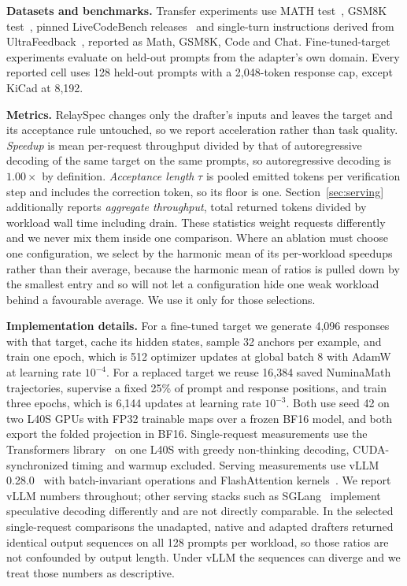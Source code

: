 \textbf{Datasets and benchmarks.} Transfer experiments use MATH test~\citep{hendrycks2021math}, GSM8K test~\citep{cobbe2021gsm8k}, pinned LiveCodeBench releases~\citep{jain2024livecodebench} and single-turn instructions derived from UltraFeedback~\citep{cui2024ultrafeedback}, reported as Math, GSM8K, Code and Chat. Fine-tuned-target experiments evaluate on held-out prompts from the adapter's own domain. Every reported cell uses 128 held-out prompts with a 2{,}048-token response cap, except KiCad at 8{,}192.

\textbf{Metrics.} RelaySpec changes only the drafter's inputs and leaves the target and its acceptance rule untouched, so we report acceleration rather than task quality. \emph{Speedup} is mean per-request throughput divided by that of autoregressive decoding of the same target on the same prompts, so autoregressive decoding is $1.00\times$ by definition. \emph{Acceptance length} $\tau$ is pooled emitted tokens per verification step and includes the correction token, so its floor is one. Section~\ref{sec:serving} additionally reports \emph{aggregate throughput}, total returned tokens divided by workload wall time including drain. These statistics weight requests differently and we never mix them inside one comparison. Where an ablation must choose one configuration, we select by the harmonic mean of its per-workload speedups rather than their average, because the harmonic mean of ratios is pulled down by the smallest entry and so will not let a configuration hide one weak workload behind a favourable average. We use it only for those selections.

\textbf{Implementation details.} For a fine-tuned target we generate 4{,}096 responses with that target, cache its hidden states, sample 32 anchors per example, and train one epoch, which is 512 optimizer updates at global batch 8 with AdamW~\citep{loshchilov2019adamw} at learning rate $10^{-4}$. For a replaced target we reuse 16{,}384 saved NuminaMath~\citep{li2024numinamath} trajectories, supervise a fixed 25\% of prompt and response positions, and train three epochs, which is 6{,}144 updates at learning rate $10^{-3}$. Both use seed 42 on two L40S GPUs with FP32 trainable maps over a frozen BF16 model, and both export the folded projection in BF16. Single-request measurements use the Transformers library~\citep{wolf2020transformers} on one L40S with greedy non-thinking decoding, CUDA-synchronized timing and warmup excluded. Serving measurements use vLLM 0.28.0~\citep{kwon2023vllm} with batch-invariant operations and FlashAttention kernels~\citep{dao2023flashattention2}. We report vLLM numbers throughout; other serving stacks such as SGLang~\citep{zheng2024sglang} implement speculative decoding differently and are not directly comparable. In the selected single-request comparisons the unadapted, native and adapted drafters returned identical output sequences on all 128 prompts per workload, so those ratios are not confounded by output length. Under vLLM the sequences can diverge and we treat those numbers as descriptive.

